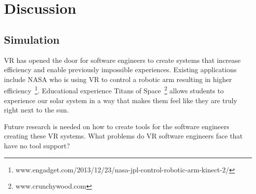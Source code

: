 \documentclass[conference]{IEEEtran}
\begin{document}

\section{Discussion}

\subsection{Simulation}


VR has opened the door for software engineers to create systems that increase efficiency and enable previously impossible experiences. 
Existing applications include NASA who is using VR to control a robotic arm resulting in higher efficiency~\footnote{www.engadget.com/2013/12/23/nasa-jpl-control-robotic-arm-kinect-2/}. Educational experience Titans of Space~\footnote{www.crunchywood.com} allows students to experience our solar system in a way that makes them feel like they are truly right next to the sun.

Future research is needed on how to create tools for the software engineers creating these VR systems.
What problems do VR software engineers face that have no tool support?






\end{document}
